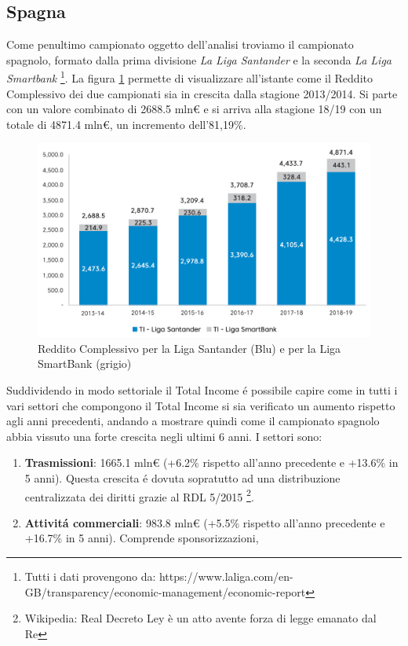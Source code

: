 \documentclass[
    corpo=12pt,
    oneside,
    evenboxes,
    tipotesi=triennale,
    stile=classica,
    oldstyle,
    autoretitolo,
    greek,
]{toptesi}
\begin{document}
\begin{interlinea}{1.5}
\subsection{Spagna}
Come penultimo campionato oggetto dell'analisi troviamo il campionato spagnolo, formato dalla prima divisione \emph{La Liga Santander} e la seconda
\emph{La Liga Smartbank} \footnote{Tutti i dati provengono da: https://www.laliga.com/en-GB/transparency/economic-management/economic-report}.
La figura \ref{total_income_spain} permette di visualizzare all'istante come il Reddito Complessivo dei due campionati sia in crescita 
dalla stagione 2013/2014. Si parte con un valore combinato di 2688.5 mln€ e si arriva alla stagione 18/19 con un totale di 4871.4 mln€, 
un incremento dell'81,19\%. 
\begin{figure}
    \centering
    \includegraphics[scale=0.5]{img/total_income_spain.png}
    \caption{Reddito Complessivo per la Liga Santander (Blu) e per la Liga SmartBank (grigio)}
    \label{total_income_spain}
\end{figure}
Suddividendo in modo settoriale il Total Income \'e possibile capire come in tutti i vari settori che compongono il Total Income 
si sia verificato un aumento rispetto agli anni precedenti, andando a mostrare quindi come il campionato spagnolo abbia vissuto una forte crescita negli ultimi 6 anni.
I settori sono:
\begin{enumerate}
    \item \textbf{Trasmissioni}: 1665.1 mln€ (+6.2\% rispetto all'anno precedente e +13.6\% in 5 anni). Questa crescita \'e dovuta sopratutto ad una distribuzione 
    centralizzata dei diritti grazie al RDL 5/2015 \footnote{Wikipedia: Real Decreto Ley è un atto avente forza di legge emanato dal Re}.
    \item \textbf{Attivit\'a commerciali}: 983.8 mln€ (+5.5\% rispetto all'anno precedente e +16.7\% in 5 anni). Comprende sponsorizzazioni,

\end{enumerate}
\end{interlinea}
\end{document}
